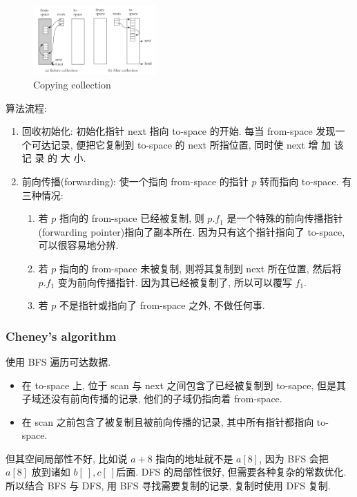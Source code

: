 \begin{figure}[!htb]
    \centering
    \includegraphics[width=0.42\textwidth]{pic/CP13/Copying collection}
    \caption{Copying collection}
\end{figure}

算法流程:
\begin{enumerate}
    \item 回收初始化: 初始化指针 next 指向 to-space 的开始. 每当 from-space 发现一个可达记录, 便把它复制到 to-space 的 next 所指位置, 同时使 next 增 加 该 记 录 的 大 小. 
    \item 前向传播(forwarding): 使一个指向 from-space 的指针 $p$ 转而指向 to-space. 有三种情况:
    \begin{enumerate}
        \item 若 $p$ 指向的 from-space 已经被复制, 则 $p.f_1$ 是一个特殊的前向传播指针(forwarding pointer)指向了副本所在. 因为只有这个指针指向了 to-space, 可以很容易地分辨. 
        \item 若 $p$ 指向的 from-space 未被复制, 则将其复制到 next 所在位置, 然后将 $p.f_1$ 变为前向传播指针. 因为其已经被复制了, 所以可以覆写 $f_1$.
        \item 若 $p$ 不是指针或指向了 from-space 之外, 不做任何事. 
    \end{enumerate}
\end{enumerate}

\subsubsection{Cheney's algorithm}
使用 BFS 遍历可达数据. 

\begin{itemize}
    \item 在 to-space 上, 位于 scan 与 next 之间包含了已经被复制到 to-sapce, 但是其子域还没有前向传播的记录, 他们的子域仍指向着 from-space. 
    \item 在 scan 之前包含了被复制且被前向传播的记录, 其中所有指针都指向 to-space.
\end{itemize}

但其空间局部性不好, 比如说 $a+8$ 指向的地址就不是 $a[8]$, 因为 BFS 会把 $a[8]$ 放到诸如 $b[\ ],c[\ ]$后面.  DFS 的局部性很好, 但需要各种复杂的常数优化. 所以结合 BFS 与 DFS, 用 BFS 寻找需要复制的记录, 复制时使用 DFS 复制. 

